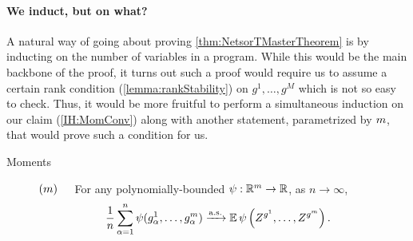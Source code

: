 \documentclass[main.tex]{subfiles}
\begin{document}
\paragraph{We induct, but on what?}
A natural way of going about proving \cref{thm:NetsorTMasterTheorem} is by inducting on the number of variables in a program.
While this would be the main backbone of the proof, it turns out such a proof would require us to assume a certain rank condition (\cref{lemma:rankStability}) on $g^1, \ldots, g^M$ which is not so easy to check.
Thus, it would be more fruitful to perform a simultaneous induction on our claim (\ref{IH:MomConv}) along with another statement, parametrized by $m$, that would prove such a condition for us.
\begin{description}
\item[Moments\label{IH:MomConv}]\!\!\!$(m)$\ \ \ 
    For any polynomially-bounded $\psi: \mathbb{R}^m \to \mathbb{R}$, as $n \to \infty$,
\begin{align*}
    \frac{1}{n} \sum_{\alpha=1}^n \psi(g^1_\alpha, \ldots, g^m_\alpha) &\xrightarrow{\mathrm{a.s.}} 
    \operatorname*{\mathbb{E}}
      \psi\left(
      Z^{g^1}, \ldots, Z^{g^m} \right)
      .
\end{align*}


\end{description}
\end{document}
